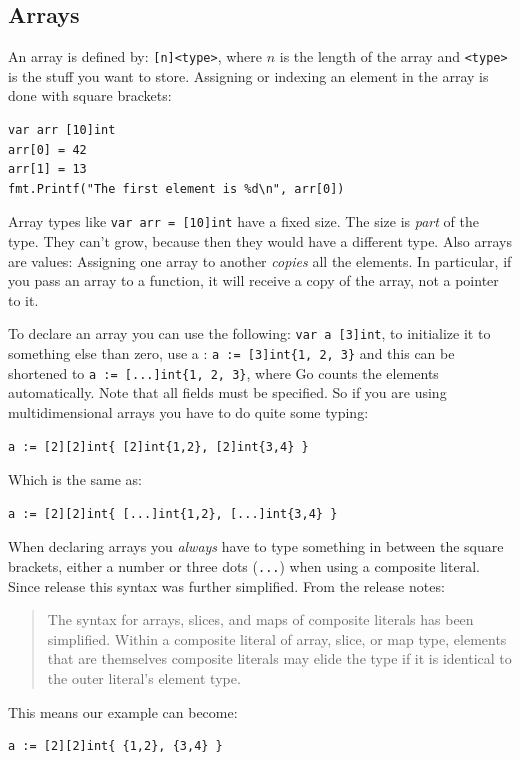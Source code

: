 \subsection{Arrays}
An array is defined by: \verb|[n]<type>|, where $n$ is the length
of the array and \verb|<type>| is the stuff you want to store.
Assigning or indexing an element in the array is done with square
brackets:
\begin{lstlisting}
var arr [10]int
arr[0] = 42
arr[1] = 13
fmt.Printf("The first element is %d\n", arr[0])
\end{lstlisting}
Array types like \lstinline{var arr = [10]int} have a fixed size. The
size is \emph{part} of the type.
They can't grow, because then they would have a different type. Also arrays
are values: Assigning one array to another \emph{copies} all the elements.
In particular, if you pass an array to a function, it will receive a
copy of the array, not a pointer to it. 

To declare an array you can use the following: \lstinline{var a [3]int},
to initialize it to something else than zero, use a 
: \lstinline|a := [3]int{1, 2, 3}| and
this can be shortened to \lstinline|a := [...]int{1, 2, 3}|, where Go counts
the elements automatically. 
Note that all fields must be specified.  So if you are using multidimensional
arrays you have to do quite some typing:
\begin{lstlisting}
a := [2][2]int{ [2]int{1,2}, [2]int{3,4} }
\end{lstlisting}
Which is the same as:
\begin{lstlisting}
a := [2][2]int{ [...]int{1,2}, [...]int{3,4} }
\end{lstlisting}
When declaring arrays you \emph{always} have to type something in
between the square brackets, either a number or three dots (\verb|...|)
when using a composite literal. 
Since release  this syntax was further simplified.
From the release notes:
\begin{quote}
The syntax for arrays, slices, and maps of composite literals has been
simplified. Within a composite literal of array, slice, or map type, elements
that are themselves composite literals may elide the type if it is identical to
the outer literal's element type. 
\end{quote}
This means our example can become:
\begin{lstlisting}
a := [2][2]int{ {1,2}, {3,4} }
\end{lstlisting}

